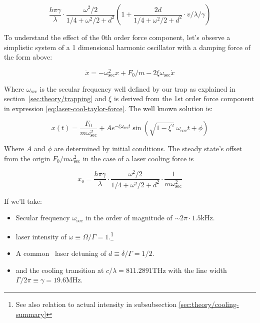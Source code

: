\begin{equation}
    \frac{h \pi \gamma}{\lambda} \cdot \frac{\omega^2/2}{1/4 + \omega^2/2 + d^2} \left(
        1 + \frac{2d}{1/4 + \omega^2/2 + d^2} \cdot v/\lambda/\gamma
    \right)
    \label{eq:laser-cool-taylor-force}
\end{equation}

To understand the effect of the 0th order force component, let's observe a simplistic system of a 1 dimensional harmonic oscillator with a damping force of the form above:

\begin{equation}
    \ddot{x} = - \omega_\mathrm{sec}^2 x + F_0/m - 2 \xi \omega_\mathrm{sec} \dot{x}
\end{equation}

Where $\omega_\mathrm{sec}$ is the secular frequency well defined by our trap as explained in section~\ref{sec:theory/trapping} and $\xi$ is derived from the 1st order force component in expression \ref{eq:laser-cool-taylor-force}. The well known solution is:

\begin{equation}
    x(t) = \frac{F_0}{m \omega_\mathrm{sec}^2} + A e^{-\xi \omega_\mathrm{sec} t} \sin(\sqrt{1-\xi^2}\ \omega_\mathrm{sec} t + \phi)
\end{equation}

Where $A$ and $\phi$ are determined by initial conditions. The steady state's offset from the origin $F_0/m\omega_\mathrm{sec}^2$ in the case of a laser cooling force is

\begin{equation}
x_o = \frac{h \pi \gamma}{\lambda}\cdot\frac{\omega^2/2}{1/4+\omega^2/2 + d^2} \cdot\frac{1}{m \omega_\mathrm{sec}^2}
\end{equation}

If we'll take:

\begin{itemize}
    \item Secular frequency $\omega_\mathrm{sec}$ in the order of magnitude of $\sim 2\pi\cdot 1.5\mathrm{kHz}$.
    \item laser intensity of $\omega \equiv \Omega/\Gamma = 1$.\footnote{See also relation to actual intensity in subsubsection \ref{sec:theory/cooling-summary}}
    \item A common~\cite{TannoudjiCooling} laser detuning of $d \equiv \delta/\Gamma = 1/2$.
    \item {} and the cooling transition at $c/\lambda = 811.2891 \mathrm{THz}$ with the line width $\Gamma/2\pi \equiv \gamma = 19.6 \mathrm{MHz}$.\cite{RansfordThesis}
\end{itemize}

